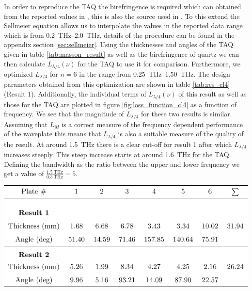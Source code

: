 In order to reproduce the TAQ the birefringence is required which can obtained from the reported values in \cite{DGrischkowsky1990}, this is also the source used in \cite{Masson2006}. To this extend the Sellmeier equation allows us to interpolate the values in the reported data range which is from \SIrange{0.2}{2.0}{\tera \hertz}, details of the procedure can be found in the appendix section \ref{sec:sellmeier}. Using the thicknesses and angles of the TAQ given in table \ref{tab:masson_result} as well as the birefringence of quartz we can then calculate $L_{\lambda/4}(\nu)$ for the TAQ to use it for comparison. Furthermore, we optimized $L_{\lambda/4}$ for $n=6$ in the range from \SIrange{0.25}{1.50}{\tera \hertz}. The design parameters obtained from this optimization are shown in table \ref{tab:res_cl4} (Result 1). Additionally, the individual terms of $L_{\lambda/4}(\nu)$ of this result as well as those for the TAQ are plotted in figure \ref{fig:loss_function_cl4} as a function of frequency. We see that the magnitude of $L_{\lambda/4}$ for these two results is similar. Assuming that $L_{M}$ is a correct measure of the frequency dependent performance of the waveplate this means that $L_{\lambda/4}$ is also a suitable measure of the quality of the result. At around \SI{1.5}{\tera \hertz} there is a clear cut-off for result 1 after which $L_{\lambda/4}$ increases steeply. This steep increase starts at around \SI{1.6}{\tera \hertz} for the TAQ. Defining the bandwidth as the ratio between the upper and lower frequency we get a value of  $\frac{\SI{1.5}{\tera \hertz}}{\SI{0.3}{\tera \hertz}}=5$. 

\begin{table}[ht]
    \centering
    \includegraphics[scale=1.0]{images/results/ceramic_result_table.pdf}
    \caption{Design parameters for result 1 and 2. Both results are obtained through the optimization of $L_{\lambda/4}$ for $n=6$. In the case of result 1 the frequency range for the optimization was limited to \SIrange[range-phrase=-, range-units=single]{0.25}{1.50}{\tera \hertz} while for result 2 the range was set to \SIrange[range-phrase=-, range-units=single]{0.50}{2.25}{\tera \hertz}.}
    \label{tab:res_cl4}
\end{table}

